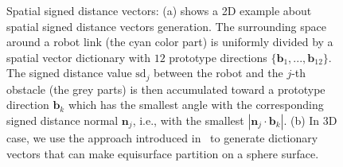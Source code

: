 \documentclass[letterpaper, 10 pt, conference]{ieeeconf}  %
\begin{document}
\begin{figure}[t]
\centering
{}
\caption{Spatial signed distance vectors: (a) shows a 2D example about spatial signed distance vectors generation. The surrounding space around a robot link (the cyan color part) is uniformly divided by a spatial vector dictionary with $12$ prototype directions $\{\mathbf b_1, ..., \mathbf b_{12}\}$. The signed distance value $\text{sd}_j$ between the robot and the $j$-th obstacle (the grey parts) is then accumulated toward a prototype direction $\mathbf b_k$ which has the smallest angle with the corresponding signed distance normal $\mathbf n_j$, i.e., with the smallest $|\mathbf n_j \cdot \mathbf b_k|$. (b) In 3D case, we use the approach introduced in~\cite{Yershova:2010:GUI} to generate dictionary vectors that can make equisurface partition on a sphere surface. }
\label{fig:trajectoryfeaturePD}
\end{figure}
\end{document}
